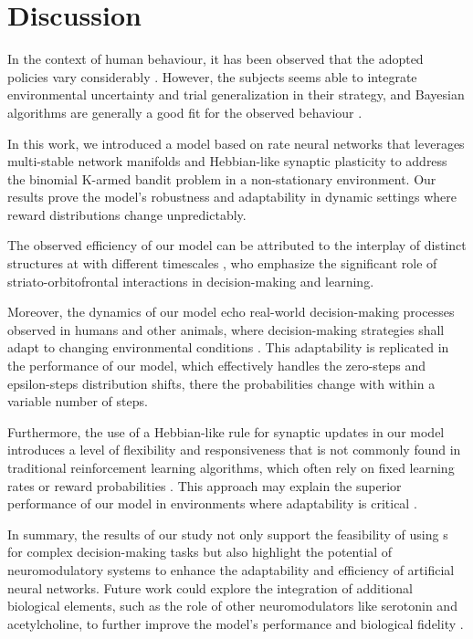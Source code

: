 
\section{Discussion}


In the context of human behaviour, it has been observed that the adopted policies vary considerably \cite{steyversBayesianAnalysisHuman2009a}. However, the subjects seems able to integrate environmental uncertainty and trial generalization in their strategy, and Bayesian algorithms are generally a good fit for the observed behaviour \cite{schulzFindingStructureMultiarmed2020, zhangForgetfulBayesMyopic2013}.


%
In this work, we introduced a model based on rate neural networks that leverages multi-stable network manifolds and Hebbian-like synaptic plasticity to address the binomial K-armed bandit problem in a non-stationary environment. Our results prove the model's robustness and adaptability in dynamic settings where reward distributions change unpredictably.

The observed efficiency of our  model can be attributed to the interplay of distinct structures at with different timescales \cite{schulzFindingStructureMultiarmed2020, reynoldsDopaminedependentPlasticityCorticostriatal2002, frankAnatomyDecisionStriatoorbitofrontal2006}, who emphasize the significant role of striato-orbitofrontal interactions in decision-making and learning.

Moreover, the dynamics of our model echo real-world decision-making processes observed in humans and other animals, where decision-making strategies shall adapt to changing environmental conditions \cite{nivEvolutionReinforcementLearning2002}. This adaptability is replicated in the performance of
our model, which effectively handles the zero-steps and epsilon-steps distribution shifts, there the probabilities change with within a variable number of steps.

Furthermore, the use of a Hebbian-like rule for synaptic updates in our model introduces a level of flexibility and responsiveness that is not commonly found in traditional reinforcement learning algorithms, which often rely on fixed learning rates or reward probabilities
\cite{suttonReinforcementLearningProblem1998}. This approach may explain the superior performance of our model in environments where adaptability is critical \cite{besbesStochasticMultiArmedBanditProblem2014}.

In summary, the results of our study not only support the feasibility of using s for complex decision-making tasks but also highlight the potential of neuromodulatory systems to enhance the adaptability and efficiency of artificial neural networks. Future work could explore the integration of
additional biological elements, such as the role of other neuromodulators like serotonin and acetylcholine, to further improve the model's performance and biological fidelity \cite{coolsChemistryAdaptiveMind2019, dayanDecisionTheoryReinforcement2008}.



